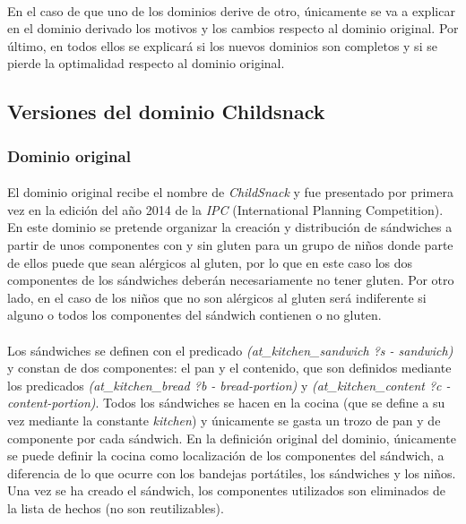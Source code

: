 \documentclass{article}
\begin{document}
\paragraph{}
En el caso de que uno de los dominios derive de otro, únicamente se va a
explicar en el dominio derivado los motivos y los cambios respecto al dominio
original. Por último, en todos ellos se explicará si los nuevos dominios son
completos y si se pierde la optimalidad respecto al dominio original.

\subsection{Versiones del dominio Childsnack}
\subsubsection{Dominio original}

\paragraph{}
El dominio original recibe el nombre de \textit{ChildSnack} y fue presentado por
primera vez en la edición del año 2014 de la \textit{IPC} (International
Planning Competition). En este dominio se pretende organizar la creación y
distribución de sándwiches a partir de unos componentes con y sin gluten para un
grupo de niños donde parte de ellos puede que sean alérgicos al gluten, por lo
que en este caso los dos componentes de los sándwiches deberán necesariamente no
tener gluten. Por otro lado, en el caso de los niños que no son alérgicos al
gluten será indiferente si alguno o todos los componentes del sándwich contienen
o no gluten.

\paragraph{}
Los sándwiches se definen con el predicado \textit{(at\_kitchen\_sandwich ?s -
sandwich)} y constan de dos componentes: el pan y el contenido, que son
definidos mediante los predicados \textit{(at\_kitchen\_bread ?b - bread-portion)}
y \textit{(at\_kitchen\_content ?c - content-portion)}. Todos los sándwiches se hacen
en la cocina (que se define a su vez mediante la constante \textit{kitchen}) y
únicamente se gasta un trozo de pan y de componente por cada sándwich. En la
definición original del dominio, únicamente se puede definir la cocina como
localización de los componentes del sándwich, a diferencia de lo que ocurre con
los bandejas portátiles, los sándwiches y los niños. Una vez se ha creado el
sándwich, los componentes utilizados son eliminados de la lista de hechos (no
son reutilizables).
\end{document}
